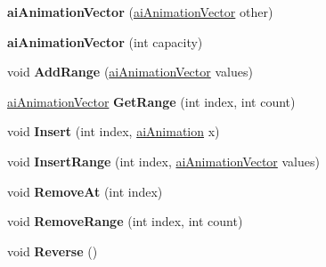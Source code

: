 \begin{DoxyCompactItemize}
\item 
\hypertarget{classai_animation_vector_a7786dcd1076caf1c350c221187785ab4}{{\bfseries ai\+Animation\+Vector} (\hyperlink{classai_animation_vector}{ai\+Animation\+Vector} other)}\label{classai_animation_vector_a7786dcd1076caf1c350c221187785ab4}

\item 
\hypertarget{classai_animation_vector_accce1f239c17542212b55fa1d0a3d8bc}{{\bfseries ai\+Animation\+Vector} (int capacity)}\label{classai_animation_vector_accce1f239c17542212b55fa1d0a3d8bc}

\item 
\hypertarget{classai_animation_vector_a75914c6b8f5857b2dbefd3b619e28dd9}{void {\bfseries Add\+Range} (\hyperlink{classai_animation_vector}{ai\+Animation\+Vector} values)}\label{classai_animation_vector_a75914c6b8f5857b2dbefd3b619e28dd9}

\item 
\hypertarget{classai_animation_vector_a1e87dce71a4760dd2fa445dd82959dab}{\hyperlink{classai_animation_vector}{ai\+Animation\+Vector} {\bfseries Get\+Range} (int index, int count)}\label{classai_animation_vector_a1e87dce71a4760dd2fa445dd82959dab}

\item 
\hypertarget{classai_animation_vector_af5e08004a63520fc5b4cb3289e42af42}{void {\bfseries Insert} (int index, \hyperlink{structai_animation}{ai\+Animation} x)}\label{classai_animation_vector_af5e08004a63520fc5b4cb3289e42af42}

\item 
\hypertarget{classai_animation_vector_a5c9705b7a09530fe4d943401d16cb040}{void {\bfseries Insert\+Range} (int index, \hyperlink{classai_animation_vector}{ai\+Animation\+Vector} values)}\label{classai_animation_vector_a5c9705b7a09530fe4d943401d16cb040}

\item 
\hypertarget{classai_animation_vector_af1ac715f169e186d6866daf25c1d3565}{void {\bfseries Remove\+At} (int index)}\label{classai_animation_vector_af1ac715f169e186d6866daf25c1d3565}

\item 
\hypertarget{classai_animation_vector_a7dedc06ef5b6b2a83e25136fe336e421}{void {\bfseries Remove\+Range} (int index, int count)}\label{classai_animation_vector_a7dedc06ef5b6b2a83e25136fe336e421}

\item 
\hypertarget{classai_animation_vector_ae933e882c9bdcb9f34a32b41ac4795cc}{void {\bfseries Reverse} ()}\label{classai_animation_vector_ae933e882c9bdcb9f34a32b41ac4795cc}


\end{DoxyCompactItemize}
